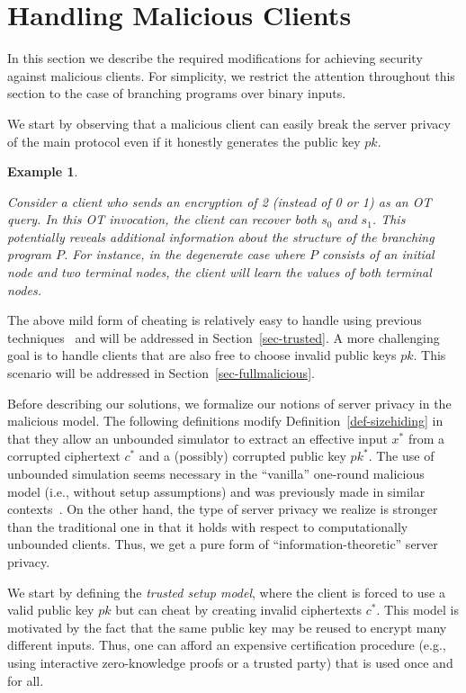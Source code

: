 \documentclass[11pt]{article}
\newtheorem{Example}[theorem]{Example}
\newenvironment{example}{\begin{Example}\begin{rm}}{\end{rm}\end{Example}}
\begin{document}
\section{Handling Malicious Clients}
\label{sec-malicious}

In this section we describe the required modifications for
achieving security against malicious clients.
For simplicity, we restrict the
attention throughout this section to the case of branching programs
over binary inputs.

We start by observing that a malicious client can easily break the
server privacy of the main protocol even if it honestly generates
the public key $pk$.

\begin{example}
\label{ex-simpleattack} Consider a client who sends an encryption
of 2 (instead of 0 or 1) as an OT query. In this OT invocation, the
client can recover both $s_0$ and $s_1$. This potentially reveals
additional information about the structure of the branching program
$P$. For instance, in the degenerate case where $P$ consists of an
initial node and two terminal nodes, the client will learn the
values of both terminal nodes.
\end{example}

The above mild form of cheating is relatively easy to handle using
previous techniques~\cite{GIKM,AIR01,L05} and will be addressed in
Section~\ref{sec-trusted}. A more challenging goal is to handle
clients that are also free to choose invalid public keys $pk$. This
scenario will be addressed in Section~\ref{sec-fullmalicious}.

Before describing our solutions, we formalize our notions of server
privacy in the malicious model. The following definitions modify
Definition~\ref{def-sizehiding} in that they allow an unbounded
simulator to extract an effective input $x^*$ from a corrupted
ciphertext $c^*$ and a (possibly) corrupted public key $pk^*$. The
use of unbounded simulation seems necessary in the ``vanilla''
one-round malicious model (i.e., without setup assumptions) and was
previously made in similar
contexts~\cite{NP01,AIR01,FIPR05,T05,L05}. On the other hand, the
type of server privacy we realize is stronger than the traditional
one in that it holds with respect to computationally unbounded
clients. Thus, we get a pure form of ``information-theoretic''
server privacy.

We start by defining the {\em trusted setup model}, where the
client is forced to use a valid public key $pk$ but can cheat by
creating invalid ciphertexts $c^*$. This model is motivated by the
fact that the same public key may be reused to encrypt many
different inputs. Thus, one can afford an expensive certification
procedure (e.g., using interactive zero-knowledge proofs or a
trusted party) that is used once and for all.
\end{document}
